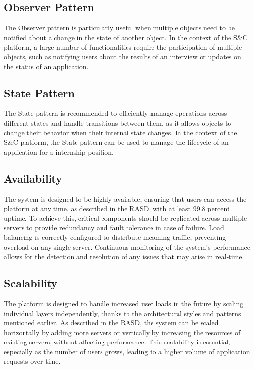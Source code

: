 \subsection{Observer Pattern}\label{subsec:observer pattern}
The Observer pattern is particularly useful when multiple objects need to be notified about a change in the state of another object. In the context of the S\&C platform, 
a large number of functionalities require the participation of multiple objects, such as notifying users about the results of an interview or updates on the status of an application.
\subsection{State Pattern}\label{subsec:state pattern}
The State pattern is recommended to efficiently manage operations across different states and handle transitions between them, as it allows objects to change their behavior 
when their internal state changes. In the context of the S\&C platform, the State pattern can be used to manage the lifecycle of an application for a internship position.

\subsection{Availability}\label{subsec:availability}
The system is designed to be highly available, ensuring that users can access the platform at any time, as described in the RASD, with at least 99.8 percent uptime. 
To achieve this, critical components should be replicated across multiple servers to provide redundancy and fault tolerance in case of failure. Load balancing is 
correctly configured to distribute incoming traffic, preventing overload on any single server. Continuous monitoring of the system's performance allows for the 
detection and resolution of any issues that may arise in real-time.
\subsection{Scalability}\label{subsec:scalability}
The platform is designed to handle increased user loads in the future by scaling individual layers independently, thanks to the architectural styles and patterns 
mentioned earlier. As described in the RASD, the system can be scaled horizontally by adding more servers or vertically by increasing the resources of existing 
servers, without affecting performance. This scalability is essential, especially as the number of users grows, leading to a higher volume of application requests 
over time.
